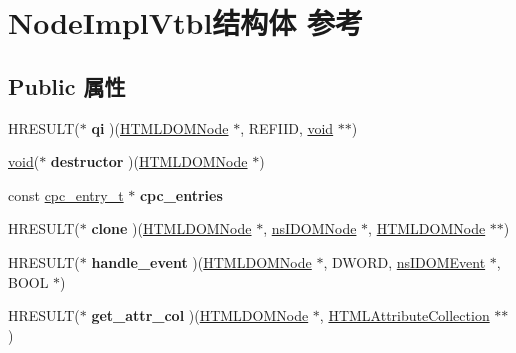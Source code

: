 \hypertarget{struct_node_impl_vtbl}{}\section{Node\+Impl\+Vtbl结构体 参考}
\label{struct_node_impl_vtbl}
\subsection*{Public 属性}
\begin{DoxyCompactItemize}
\item 
\mbox{\label{struct_node_impl_vtbl_a3f225b770d399f82ab6299d2db72503f}} 
H\+R\+E\+S\+U\+LT($\ast$ {\bfseries qi} )(\hyperlink{struct_h_t_m_l_d_o_m_node}{H\+T\+M\+L\+D\+O\+M\+Node} $\ast$, R\+E\+F\+I\+ID, \hyperlink{interfacevoid}{void} $\ast$$\ast$)
\item 
\mbox{\label{struct_node_impl_vtbl_aae0eca2e2a9525b3c7dedb650de0e519}} 
\hyperlink{interfacevoid}{void}($\ast$ {\bfseries destructor} )(\hyperlink{struct_h_t_m_l_d_o_m_node}{H\+T\+M\+L\+D\+O\+M\+Node} $\ast$)
\item 
\mbox{\label{struct_node_impl_vtbl_a941ffc3fcf560cfaf26f3804efe88c40}} 
const \hyperlink{structcpc__entry__t}{cpc\+\_\+entry\+\_\+t} $\ast$ {\bfseries cpc\+\_\+entries}
\item 
\mbox{\label{struct_node_impl_vtbl_a3129c0c43d63b455a5ab05e56eb85ed6}} 
H\+R\+E\+S\+U\+LT($\ast$ {\bfseries clone} )(\hyperlink{struct_h_t_m_l_d_o_m_node}{H\+T\+M\+L\+D\+O\+M\+Node} $\ast$, \hyperlink{interfacens_i_d_o_m_node}{ns\+I\+D\+O\+M\+Node} $\ast$, \hyperlink{struct_h_t_m_l_d_o_m_node}{H\+T\+M\+L\+D\+O\+M\+Node} $\ast$$\ast$)
\item 
\mbox{\label{struct_node_impl_vtbl_af4a97b2b52223329da71c5c844501f74}} 
H\+R\+E\+S\+U\+LT($\ast$ {\bfseries handle\+\_\+event} )(\hyperlink{struct_h_t_m_l_d_o_m_node}{H\+T\+M\+L\+D\+O\+M\+Node} $\ast$, D\+W\+O\+RD, \hyperlink{interfacens_i_d_o_m_event}{ns\+I\+D\+O\+M\+Event} $\ast$, B\+O\+OL $\ast$)
\item 
\mbox{\label{struct_node_impl_vtbl_a1df86b84f7aafda74c81af6d0e4f7a64}} 
H\+R\+E\+S\+U\+LT($\ast$ {\bfseries get\+\_\+attr\+\_\+col} )(\hyperlink{struct_h_t_m_l_d_o_m_node}{H\+T\+M\+L\+D\+O\+M\+Node} $\ast$, \hyperlink{struct_h_t_m_l_attribute_collection}{H\+T\+M\+L\+Attribute\+Collection} $\ast$$\ast$)
$$
\end{DoxyCompactItemize}
